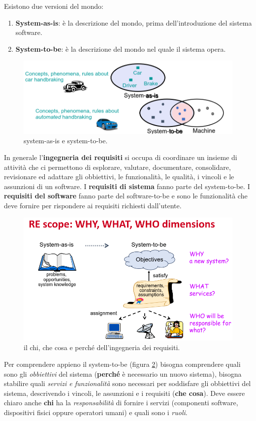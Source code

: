 \documentclass[italian]{article}
\begin{document}
	Esistono due versioni del mondo:
	\begin{enumerate}
		\item \textbf{System-as-is}: è la descrizione del mondo, prima dell'introduzione del sistema software.
		\item \textbf{System-to-be}: è la descrizione del mondo nel quale il sistema opera.
	\end{enumerate}
	\begin{figure}[th]
		\centering
		\includegraphics[width=0.7\linewidth]{img/system-as-is-system-to-be}
		\caption{system-as-is e system-to-be.}
		\label{fig:system-as-is-system-to-be}
	\end{figure}
	In generale l'\textbf{ingegneria dei requisiti} si occupa di coordinare un insieme di attività che ci permettono di esplorare, valutare, documentare, consolidare, revisionare ed adattare gli obbiettivi, le funzionalità, le qualità, i vincoli e le assunzioni di un software.
	I \textbf{requisiti di sistema} fanno parte del system-to-be. I \textbf{requisiti del software} fanno parte del software-to-be e sono le funzionalità che deve fornire per rispondere ai requisiti richiesti dall'utente.
	\begin{figure}[th]
		\centering
		\includegraphics[width=0.7\linewidth]{img/www-dimensions}
		\caption{il chi, che cosa e perché dell'ingegneria dei requisiti.}
		\label{fig:www-dimensions}
	\end{figure}

	Per comprendere appieno il system-to-be (figura \ref{fig:www-dimensions}) bisogna comprendere quali sono gli \emph{obbiettivi} del sistema (\textbf{perché} è necessario un nuovo sistema), bisogna stabilire quali \emph{servizi e funzionalità} sono necessari per soddisfare gli obbiettivi del sistema, descrivendo i vincoli, le assunzioni e i requisiti (\textbf{che cosa}). Deve essere chiaro anche \textbf{chi} ha la \emph{responsabilità} di fornire i servizi (componenti software, dispositivi fisici oppure operatori umani) e quali sono i \emph{ruoli}.
\end{document}
